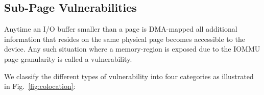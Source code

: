 



\subsection{Sub-Page Vulnerabilities}\label{sec:subpage}

Anytime an I/O buffer smaller than a page is DMA-mapped all additional information that resides on the same physical page becomes accessible to the device. Any such situation where a memory-region is exposed due to the IOMMU page granularity is called a \subpage vulnerability.

We classify the different types of \subpage vulnerability into four categories as illustrated in Fig.~\ref{fig:colocation}:

